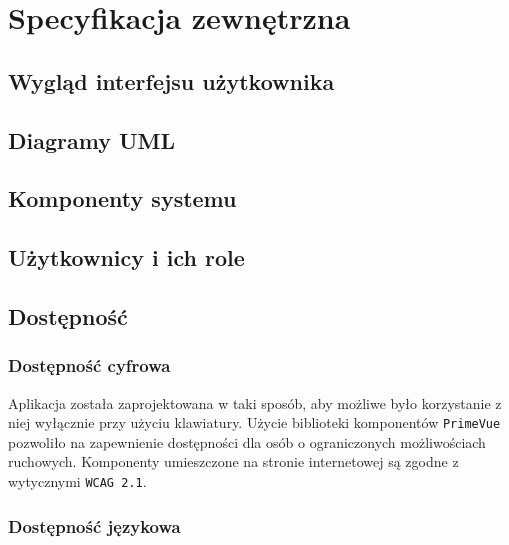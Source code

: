 \chapter{Specyfikacja zewnętrzna}
\label{ch:04}

\section{Wygląd interfejsu użytkownika}


\section{Diagramy UML}


\section{Komponenty systemu}

\section{Użytkownicy i ich role}


\section{Dostępność}

\subsection{Dostępność cyfrowa}

Aplikacja została zaprojektowana w taki sposób, aby możliwe było korzystanie z niej wyłącznie przy użyciu klawiatury. Użycie biblioteki komponentów \texttt{PrimeVue} pozwoliło na zapewnienie dostępności dla osób o ograniczonych możliwościach ruchowych. Komponenty umieszczone na stronie internetowej są zgodne z wytycznymi \texttt{WCAG 2.1}. \cite{bib:WCAG21}

\subsection{Dostępność językowa}

